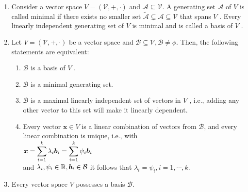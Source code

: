 \begin{enumerate}
    \item
    \begin{definition}[Basis]
        Consider a vector space $V = (\mathcal{V}, +, \cdot)$ and $\mathcal{A} \subseteq  \mathcal{V}$. 
        A generating set $\mathcal{A}$ of $V$ is called minimal if there exists no smaller set $\tilde{\mathcal{A}} \subsetneq \mathcal{A} \subseteq \mathcal{V}$ that spans $V$ . 
        Every linearly independent generating set of $V$ is minimal and is called a basis of $V$ .
        \hfill \cite{mfml/book/mml/Deisenroth-Faisal-Ong}
    \end{definition}

    \item Let $V = (\mathcal{V}, +, \cdot)$ be a vector space and $\mathcal{B} \subseteq \mathcal{V}, \mathcal{B} \neq \phi$. Then, the following statements are equivalent:
    \hfill \cite{mfml/book/mml/Deisenroth-Faisal-Ong}
    \begin{enumerate}
        \item $\mathcal{B}$ is a basis of $V$ .
        \hfill \cite{mfml/book/mml/Deisenroth-Faisal-Ong}

        \item $\mathcal{B}$ is a minimal generating set.
        \hfill \cite{mfml/book/mml/Deisenroth-Faisal-Ong}

        \item $\mathcal{B}$ is a maximal linearly independent set of vectors in $V$ , i.e., adding any other vector to this set will make it linearly dependent.
        \hfill \cite{mfml/book/mml/Deisenroth-Faisal-Ong}

        \item Every vector $\bm{x} \in V$ is a linear combination of vectors from $\mathcal{B}$, and every linear combination is unique, i.e., with
        \\
        $
            \bm{x} 
            = \displaystyle\sum_{i=1}^k \lambda_i \bm{b}_i
            = \displaystyle\sum_{i=1}^k \psi_i \bm{b}_i
        $
        \\
        and $\lambda_i , \psi_i \in \mathbb{R}, \bm{b}_i \in \mathcal{B}$ it follows that $\lambda_i = \psi_i , i = 1, \cdots , k$.
        \hfill \cite{mfml/book/mml/Deisenroth-Faisal-Ong}
    \end{enumerate}

    \item Every vector space $V$ possesses a basis $\mathcal{B}$.
    \hfill \cite{mfml/book/mml/Deisenroth-Faisal-Ong}


\end{enumerate}
